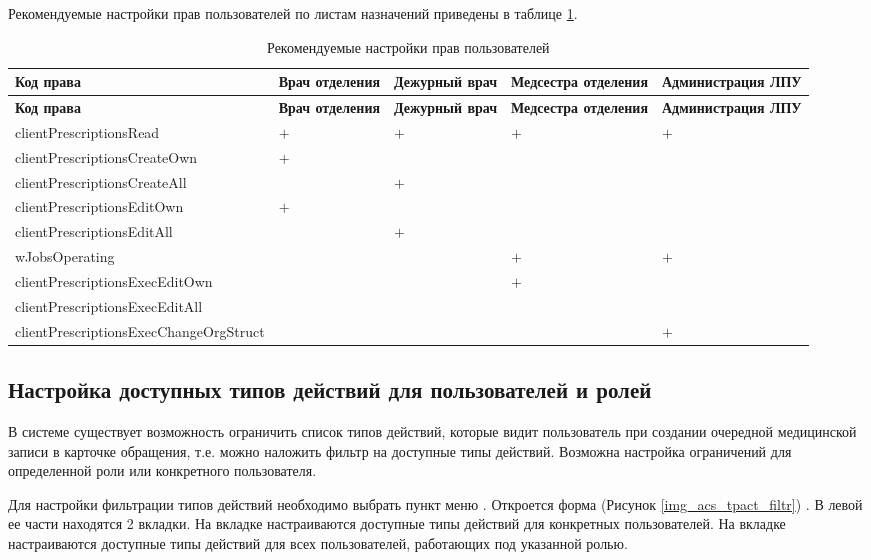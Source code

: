 Рекомендуемые настройки прав пользователей по листам назначений приведены в таблице \ref{tbl_acs_roles_ln}.

{\small
\begin{longtable}{|p{7.6cm}|p{2.1cm}|p{2.1cm}|p{2.1cm}|p{2.1cm}|}
\caption{Рекомендуемые настройки прав пользователей \label{tbl_acs_roles_ln}} \\
\hline \rule{0pt}{15pt} \centering \textbf{Код права} & \centering \textbf{Врач отделения} & \centering \textbf{Дежур\-ный врач} & \centering \textbf{Медсест\-ра отделения} & \textbf{Админист\-ра\-ция ЛПУ} \\ \hline
\endfirsthead
\hline \rule{0pt}{15pt} \centering \textbf{Код права} & \centering \textbf{Врач отделения} & \centering \textbf{Дежур\-ный врач} & \centering \textbf{Медсест\-ра отделения} & \textbf{Адми\-нист\-ра\-ция ЛПУ} \\ \hline
\endhead			
clientPrescriptionsRead &	\centering $+$	&	\centering $+$		&	\centering $+$ & \hfil $+$ \\ \hline
clientPrescriptionsCreateOwn &		\centering $+$	& & & \\ \hline		
clientPrescriptionsCreateAll & &	\centering $+$ & & \\ \hline		
clientPrescriptionsEditOwn	&	\centering $+$ & & & \\ \hline			
clientPrescriptionsEditAll	&	&	\centering $+$ & & \\ \hline		
wJobsOperating	& &	 & 	\centering $+$	& \hfil $+$ \\ \hline
clientPrescriptionsExecEditOwn & & & \centering $+$ & \\ \hline	
clientPrescriptionsExecEditAll	& & & & \\ \hline			
clientPrescriptionsExecChangeOrgStruct	& & & & \hfil $+$ \\ \hline
\end{longtable}
}

\subsection{Настройка доступных типов действий для пользователей и ролей}

В системе существует возможность ограничить список типов действий, которые видит пользователь при создании очередной медицинской записи в карточке обращения, т.е. можно наложить фильтр на доступные типы действий. Возможна настройка ограничений для определенной роли или конкретного пользователя.

Для настройки фильтрации типов действий необходимо выбрать пункт меню . Откроется форма (Рисунок \ref{img_acs_tpact_filtr}) . В левой ее части находятся 2 вкладки. На вкладке  настраиваются доступные типы действий для конкретных пользователей. На вкладке  настраиваются доступные типы действий для всех пользователей, работающих под указанной ролью.

